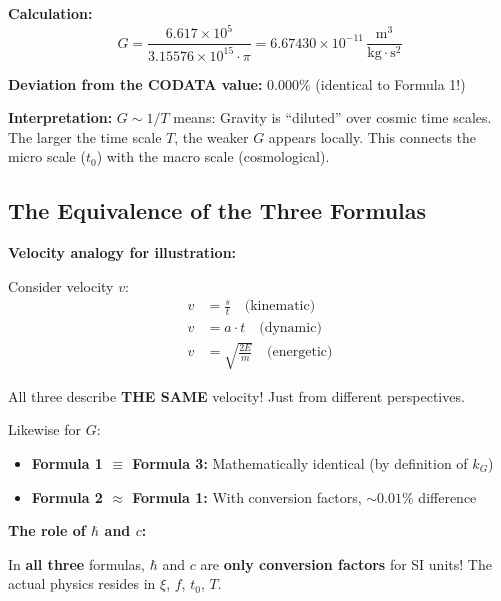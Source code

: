 	\textbf{Calculation:}
	\begin{equation}
		G = \frac{6.617 \times 10^5}{3.15576 \times 10^{15} \cdot \pi} = 6.67430 \times 10^{-11}\,\frac{\text{m}^3}{\text{kg} \cdot \text{s}^2}
	\end{equation}
	
	\textbf{Deviation from the CODATA value:} \(0.000\%\) (identical to Formula 1!)
	
	\textbf{Interpretation:} \(G \sim 1/T\) means: Gravity is \enquote{diluted} over cosmic time scales. The larger the time scale \(T\), the weaker \(G\) appears locally. This connects the micro scale (\(t_0\)) with the macro scale (cosmological).
	
	\subsection{The Equivalence of the Three Formulas}
	
	\textbf{Velocity analogy for illustration:}
	
	Consider velocity \(v\):
	\begin{align}
		v &= \frac{s}{t} \quad \text{(kinematic)} \\
		v &= a \cdot t \quad \text{(dynamic)} \\
		v &= \sqrt{\frac{2E}{m}} \quad \text{(energetic)}
	\end{align}
	
	All three describe \textbf{THE SAME} velocity! Just from different perspectives.
	
	Likewise for \(G\):
	\begin{itemize}
		\item \textbf{Formula 1 \(\equiv\) Formula 3:} Mathematically identical (by definition of \(k_G\))
		\item \textbf{Formula 2 \(\approx\) Formula 1:} With conversion factors, \(\sim0.01\%\) difference
	\end{itemize}
	
	\textbf{The role of \(\hbar\) and \(c\):}
	
	In \textbf{all three} formulas, \(\hbar\) and \(c\) are \textbf{only conversion factors} for SI units! The actual physics resides in \(\xi\), \(f\), \(t_0\), \(T\).
	
	\begin{table}[h!]
		\centering
		\caption{The three perspectives on \(G\) -- one constant, three viewpoints.}
	\end{table}
	
